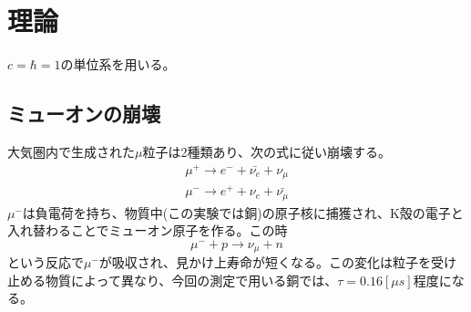 \section{理論}
$c=\hbar=1$の単位系を用いる。
\subsection{ミューオンの崩壊}
大気圏内で生成された$\mu$粒子は2種類あり、次の式に従い崩壊する。
\begin{align}
\mu^+\to e^-+\bar{\nu_e}+\nu_\mu \\
\mu^-\to e^++{\nu_e}+\bar{\nu_\mu}
\end{align}
$\mu^-$は負電荷を持ち、物質中(この実験では銅)の原子核に捕獲され、K殻の電子と入れ替わることでミューオン原子を作る。この時
\begin{equation}
\mu^-+p \to\nu_\mu+n
\end{equation}
という反応で$\mu^-$が吸収され、見かけ上寿命が短くなる。この変化は粒子を受け止める物質によって異なり、今回の測定で用いる銅では、$\tau=0.16[\mu s]$程度になる。

